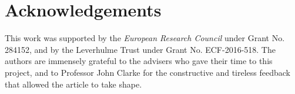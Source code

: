 \section{Acknowledgements}
\label{paper5:acknowledgements}

This work was supported by the \textit{European Research Council} under Grant No. 284152, and by the Leverhulme Trust under Grant No. ECF-2016-518. The authors are immensely grateful to the advisers who gave their time to this project, and to Professor John Clarke for the constructive and tireless feedback that allowed the article to take shape.